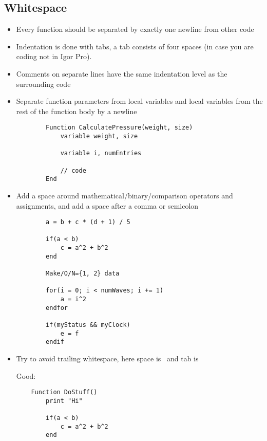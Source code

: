 \documentclass{scrartcl}
\begin{document}
\subsection*{Whitespace}
%
\begin{itemize}
	\item Every function should be separated by exactly one newline from other code
%
	\item Indentation is done with tabs, a tab consists of four spaces (in case you are coding not in Igor Pro).
%
	\item Comments on separate lines have the same indentation level as the surrounding code
%
	\item Separate function parameters from local variables and local variables from the rest of the function body by a newline
	\begin{verbatim}
		Function CalculatePressure(weight, size)
			variable weight, size

			variable i, numEntries

			// code
		End
	\end{verbatim}
%
	\item Add a space around mathematical/binary/comparison operators and assignments, and add a space after a comma or semicolon
	\begin{verbatim}
		a = b + c * (d + 1) / 5

		if(a < b)
			c = a^2 + b^2
		end

		Make/O/N={1, 2} data

		for(i = 0; i < numWaves; i += 1)
			a = i^2
		endfor

		if(myStatus && myClock)
			e = f
		endif
	\end{verbatim}
%
	\item Try to avoid trailing whitespace, here space is \FancyVerbSpace\normalfont\ and tab is \FancyVerbTab\par
	Good:\par
	\begin{verbatim}
	Function DoStuff()
		print "Hi"

		if(a < b)
			c = a^2 + b^2
		end


\end{verbatim}
\end{itemize}
\end{document}
